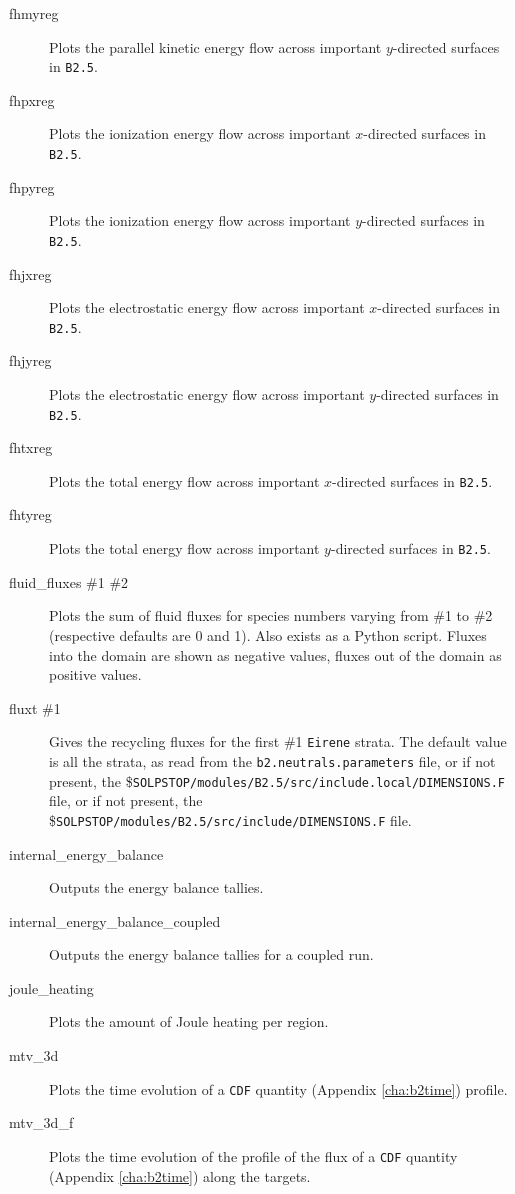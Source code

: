 \documentclass[a4paper,10pt]{report}
\begin{document}
\begin{itemize}
\begin{description}
  \item[fhmyreg] Plots the parallel kinetic energy flow across important $y$-directed surfaces in {\tt B2.5}.
  \item[fhpxreg] Plots the ionization energy flow across important $x$-directed surfaces in {\tt B2.5}.
  \item[fhpyreg] Plots the ionization energy flow across important $y$-directed surfaces in {\tt B2.5}.
  \item[fhjxreg] Plots the electrostatic energy flow across important $x$-directed surfaces in {\tt B2.5}.
  \item[fhjyreg] Plots the electrostatic energy flow across important $y$-directed surfaces in {\tt B2.5}.
  \item[fhtxreg] Plots the total energy flow across important $x$-directed surfaces in {\tt B2.5}.
  \item[fhtyreg] Plots the total energy flow across important $y$-directed surfaces in {\tt B2.5}.
  \item[fluid\_fluxes \#1 \#2] Plots the sum of fluid fluxes for species numbers varying from \#1 to \#2 (respective defaults are 0 and 1). Also exists as a Python script. Fluxes into the domain are shown as negative values, fluxes out of the domain as positive values.
  \item[fluxt \#1] Gives the recycling fluxes for the first \#1 {\tt Eirene} strata. The default value is all the strata, as read from the {\tt b2.neutrals.parameters} file, or if not present, the \${\tt SOLPSTOP/modules/B2.5/src\allowbreak/include.local/DIMENSIONS.F} file, or if not present, the \${\tt SOLPSTOP/modules/B2.5/src\allowbreak/include/DIMENSIONS.F} file.
  \item[internal\_energy\_balance] Outputs the energy balance tallies.
  \item[internal\_energy\_balance\_coupled] Outputs the energy balance tallies for a coupled run.
  \item[joule\_heating] Plots the amount of Joule heating per region.
  \item[mtv\_3d] Plots the time evolution of a {\tt CDF} quantity (Appendix \ref{cha:b2time}) profile.
  \item[mtv\_3d\_f] Plots the time evolution of the profile of the flux of a {\tt CDF} quantity (Appendix \ref{cha:b2time}) along the targets.

\end{description}
\end{itemize}
\end{document}
